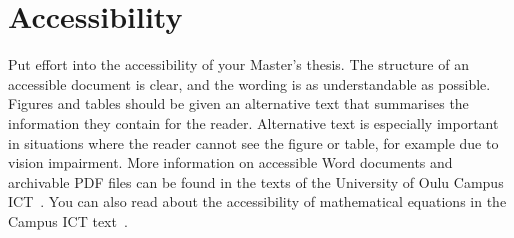 \section{Accessibility}
\label{accessibility}
Put effort into the accessibility of your Master’s thesis. The
structure of an accessible document is clear, and the wording is as
understandable as possible. Figures and tables should be given an
alternative text that summarises the information they contain for the
reader. Alternative text is especially important in situations where
the reader cannot see the figure or table, for example due to vision
impairment.  More information on accessible Word documents and
archivable PDF files can be found in the texts of the University of
Oulu Campus ICT~\cite{ictaccessibleword,ictwordpdfa}. You can also
read about the accessibility of mathematical equations in the Campus
ICT text~\cite{ictaccessiblemath}.


